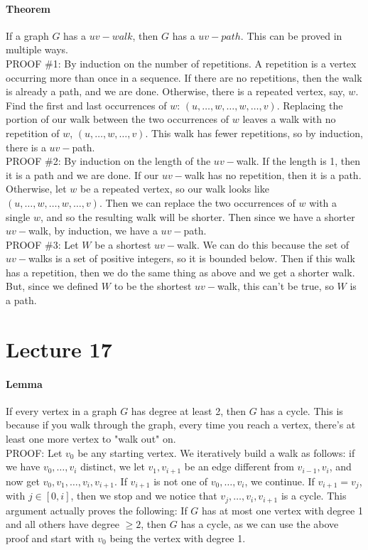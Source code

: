\documentclass[10pt,letter]{article}
\begin{document}
\paragraph{Theorem}
If a graph $G$ has a $uv-walk$, then $G$ has a $uv-path$. This can be proved in multiple ways.\\ 
PROOF \#1: By induction on the number of repetitions. A repetition is a vertex occurring more than once in a sequence. If there are no repetitions, then the walk is already a path, and we are done. Otherwise, there is a repeated vertex, say, $w$. Find the first and last occurrences of $w$: $(u,\ldots,w,\ldots,w,\ldots,v)$. Replacing the portion of our walk between the two occurrences of $w$ leaves a walk with no repetition of $w$, $(u,\ldots,w,\ldots,v)$. This walk has fewer repetitions, so by induction, there is a $uv-$path. \\ 
PROOF \#2: By induction on the length of the $uv-$walk. If the length is 1, then it is a path and we are done. If our $uv-$walk has no repetition, then it is a path. Otherwise, let $w$ be a repeated vertex, so our walk looks like $(u,\ldots,w,\ldots,w,\ldots,v)$. Then we can replace the two occurrences of $w$ with a single $w$, and so the resulting walk will be shorter. Then since we have a shorter $uv-$walk, by induction, we have a $uv-$path. \\ 
PROOF \#3: Let $W$ be a shortest $uv-$walk. We can do this because the set of $uv-$walks is a set of positive integers, so it is bounded below. Then if this walk has a repetition, then we do the same thing as above and we get a shorter walk. But, since we defined $W$ to be the shortest $uv-$walk, this can't be true, so $W$ is a path. 

\section*{Lecture 17}
\paragraph{Lemma}
If every vertex in a graph $G$ has degree at least 2, then $G$ has a cycle. This is because if you walk through the graph, every time you reach a vertex, there's at least one more vertex to "walk out" on. \\
PROOF: Let $v_0$ be any starting vertex. We iteratively build a walk as follows: if we have $v_0,\ldots,v_i$ distinct, we let $v_1,v_{i+1}$ be an edge different from $v_{i-1},v_i$, and now get $v_0,v_1,\ldots,v_i,v_{i+1}$. If $v_{i+1}$ is not one of $v_0,\ldots,v_i$, we continue. If $v_{i+1}=v_j$, with $j\in[0,i]$, then we stop and we notice that $v_j,\ldots,v_i,v_{i+1}$ is a cycle. This argument actually proves the following: If $G$ has at most one vertex with degree 1 and all others have degree $\geq2$, then $G$ has a cycle, as we can use the above proof and start with $v_0$ being the vertex with degree 1. 
\end{document}
